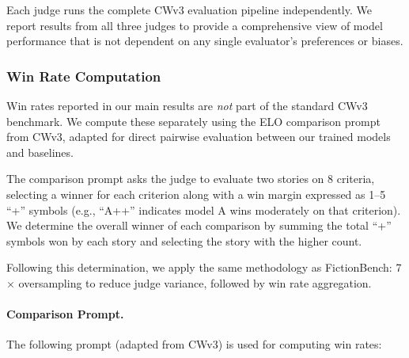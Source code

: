 \documentclass{article}
\theoremstyle{plain}
\theoremstyle{definition}
\theoremstyle{remark}
\begin{document}
Each judge runs the complete CWv3 evaluation pipeline independently. We report results from all three judges to provide a comprehensive view of model performance that is not dependent on any single evaluator's preferences or biases.

\subsubsection{Win Rate Computation}

Win rates reported in our main results are \textit{not} part of the standard CWv3 benchmark. We compute these separately using the ELO comparison prompt from CWv3, adapted for direct pairwise evaluation between our trained models and baselines.

The comparison prompt asks the judge to evaluate two stories on 8 criteria, selecting a winner for each criterion along with a win margin expressed as 1--5 ``+'' symbols (e.g., ``A++'' indicates model A wins moderately on that criterion). We determine the overall winner of each comparison by summing the total ``+'' symbols won by each story and selecting the story with the higher count.

Following this determination, we apply the same methodology as FictionBench: 7$\times$ oversampling to reduce judge variance, followed by win rate aggregation.

\paragraph{Comparison Prompt.}
The following prompt (adapted from CWv3) is used for computing win rates:
\end{document}

